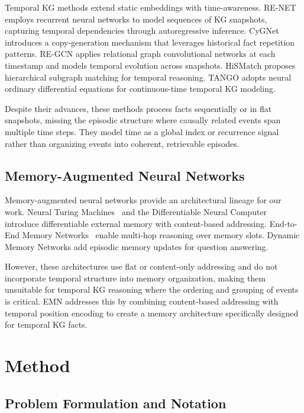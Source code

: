 \documentclass{article}
\begin{document}
Temporal KG methods extend static embeddings with time-awareness. RE-NET~\citep{jin2020renet} employs recurrent neural networks to model sequences of KG snapshots, capturing temporal dependencies through autoregressive inference. CyGNet~\citep{zhu2021cygnet} introduces a copy-generation mechanism that leverages historical fact repetition patterns. RE-GCN applies relational graph convolutional networks at each timestamp and models temporal evolution across snapshots. HiSMatch proposes hierarchical subgraph matching for temporal reasoning. TANGO adopts neural ordinary differential equations for continuous-time temporal KG modeling.

Despite their advances, these methods process facts sequentially or in flat snapshots, missing the episodic structure where causally related events span multiple time steps. They model time as a global index or recurrence signal rather than organizing events into coherent, retrievable episodes.

\subsection{Memory-Augmented Neural Networks}

Memory-augmented neural networks provide an architectural lineage for our work. Neural Turing Machines~\citep{graves2014ntm} and the Differentiable Neural Computer~\citep{graves2016dnc} introduce differentiable external memory with content-based addressing. End-to-End Memory Networks~\citep{sukhbaatar2015memnn} enable multi-hop reasoning over memory slots. Dynamic Memory Networks add episodic memory updates for question answering.

However, these architectures use flat or content-only addressing and do not incorporate temporal structure into memory organization, making them unsuitable for temporal KG reasoning where the ordering and grouping of events is critical. EMN addresses this by combining content-based addressing with temporal position encoding to create a memory architecture specifically designed for temporal KG facts.

\section{Method}
\label{sec:method}

\subsection{Problem Formulation and Notation}
\label{sec:method:formulation}
\end{document}
